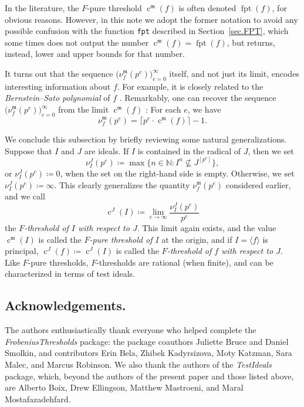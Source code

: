 \documentclass{amsart}
\newcommand{\ft}{\operatorname{c}}
\newcommand{\idealm}{\mathfrak{m}}
\DeclareMathOperator{\fpt}{fpt}
\begin{document}
In the literature, the $F$-pure threshold $\ft^{\idealm}(f)$ is often denoted $\fpt(f)$, for obvious reasons.
However, in this note we adopt the former notation to avoid any possible confusion with the function \texttt{fpt} described in Section~\ref{sec.FPT}, which some times does not output the number $\ft^{\idealm}(f) = \fpt(f)$, but returns, instead, lower and upper bounds for that number.

It turns out that the sequence $\big(\nu_f^{\idealm}(p^e) \big)_{e=0}^{\infty}$ itself, and not just its limit, encodes interesting information about $f$.  For example, it is closely related to the \emph{Bernstein--Sato polynomial} of $f$ \cite{MustataTakagiWatanabeFThresholdsAndBernsteinSato}.  
Remarkably, 
one can recover the sequence $\big( \nu_f^{\idealm}(p^e) \big)_{e=0}^{\infty}$ from the limit $\ft^{\idealm}(f)$ \cite{MustataTakagiWatanabeFThresholdsAndBernsteinSato, HernandezFPurityOfHypersurfaces}: For each $e$, we have
\begin{equation*}
\nu_f^{\idealm}(p^e) = \lceil p^e \cdot \ft^{\idealm}(f) \rceil - 1.
\end{equation*}

We conclude this subsection by briefly reviewing some natural generalizations.
Suppose that $I$ and $J$ are ideals.
If $I$ is contained in the radical of $J$, then we set
%
\[ \nu_I^J(p^e) \coloneqq \max \{ n \in \mathbb{N}: I^n \not\subseteq J^{[p^e]} \}, \]
or $\nu_I^J(p^e) \coloneqq 0$, when the set on the right-hand side is empty.
Otherwise, we set $\nu_I^J(p^e) \coloneqq \infty$.
This clearly generalizes the quantity $\nu_f^{\idealm}(p^e)$ considered earlier, and we call
\[ \ft^J(I) \coloneqq  \lim_{e \to \infty} \frac{ \nu_I^J(p^e)}{p^e} \]
the \emph{$F$-threshold of $I$ with respect to $J$}. 
This limit again exists, and the value $\ft^{\idealm}(I)$ is called the \emph{$F$-pure threshold of $I$} at the origin, and if $I = \langle f \rangle$ is principal,  $\ft^{J}(f) \coloneqq  \ft^J(I)$ is called the \emph{$F$-threshold of $f$ with respect to $J$}.
Like $F$-pure thresholds, $F$-thresholds are rational (when finite), and can be characterized in terms of test ideals.

\subsection*{Acknowledgements.}  The authors enthusiastically thank everyone who helped complete the \emph{FrobeniusThresholds} package: the package coauthors Juliette Bruce and Daniel Smolkin, and contributors  Erin Bela, Zhibek Kadyrsizova, Moty Katzman, Sara Malec, and Marcus Robinson.  We also thank the authors of the \emph{TestIdeals} package, which, beyond the authors of the present paper and those listed above, are Alberto Boix, Drew Ellingson, Matthew Mastroeni, and Maral Mostafazadehfard.
\end{document}
